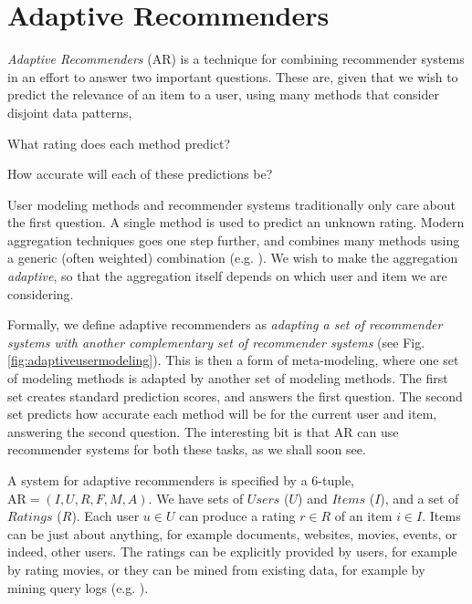 \section{Adaptive Recommenders}
\label{sec:adaptive}

\emph{Adaptive Recommenders} (AR) is a technique for combining recommender systems
in an effort to answer two important questions.
These are,
given that we wish to predict the relevance of an item to a user,
using many methods that consider disjoint data patterns,

\begin{enumerate*}
  \item What rating does each method predict?
  \item How accurate will each of these predictions be?
\end{enumerate*}

User modeling methods and recommender systems traditionally only care about the first question.
A single method is used to predict an unknown rating.
Modern aggregation techniques goes one step further, and combines many methods using a generic (often weighted) combination
(e.g. \cite{Bell2007b, Huang2002}).
We wish to make the aggregation \emph{adaptive},
so that the aggregation itself depends on which user and item we are considering.

Formally, we define adaptive recommenders as \emph{adapting a set of recommender systems
with another complementary set of recommender systems} 
(see Fig. \ref{fig:adaptiveusermodeling}).
This is then a form of meta-modeling, where one set of modeling methods
is adapted by another set of modeling methods.
The first set creates standard prediction scores, and answers the first question.
The second set predicts how accurate each method will be for the current user and item,
answering the second question.
The interesting bit is that AR can use recommender systems for both these tasks, as we shall soon see.

A system for adaptive recommenders is specified by a 6-tuple, 
$\mathrm{AR} = (I,U,R,F,M,A)$.
We have sets of $Users$ ($U$) and $Items$ ($I$), 
and a set of $Ratings$ ($R$).
Each user $u \in U$ can produce a rating $r \in R$ of an item $i \in I$.
Items can be just about anything, for example documents, websites, movies, events, or indeed, other users.
The ratings can be explicitly provided by users, for example by rating movies,
or they can be mined from existing data, for example by mining query logs
(e.g. \cite{Liu2002, Sugiyama2004, Shen2005, Speretta2000}).

